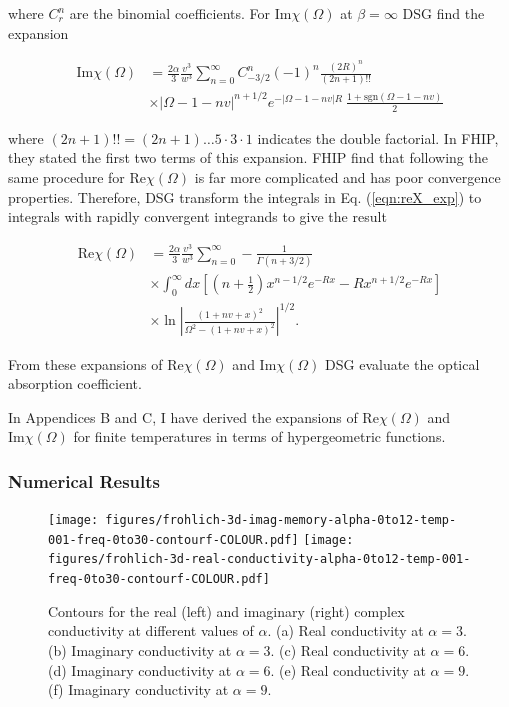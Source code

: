 where $C^n_r$ are the binomial coefficients. For $\text{Im}\chi(\Omega)$ at $\beta = \infty$ DSG find the expansion

\begin{equation}
    \begin{split}
        \textrm{Im}\chi(\Omega) &= \frac{2\alpha}{3} \frac{v^3}{w^3} \sum_{n=0}^\infty C^n_{-3/2} (-1)^n \frac{(2R)^n}{(2n + 1)!!} \\
        &\times |\Omega -1 - nv|^{n + 1/2} e^{-|\Omega - 1 -nv|R}\ \frac{1 + \textrm{sgn}(\Omega - 1 - nv)}{2}
    \end{split}
\end{equation}

where $(2n + 1)!! = (2n + 1) \dots 5 \cdot 3 \cdot 1$ indicates the double factorial. In FHIP, they stated the first two terms of this expansion. FHIP find that following the same procedure for $\text{Re}\chi(\Omega)$ is far more complicated and has poor convergence properties. Therefore, DSG transform the integrals in Eq. (\ref{eqn:reX_exp}) to integrals with rapidly convergent integrands to give the result

\begin{equation}
    \begin{split}
    \textrm{Re}\chi(\Omega) &= \frac{2\alpha}{3} \frac{v^3}{w^3} \sum_{n=0}^\infty -\frac{1}{\Gamma(n + 3/2)} \\
    &\times\int_0^\infty dx \left[ \left(n + \frac{1}{2}\right) x^{n-1/2} e^{-Rx} - R x^{n + 1/2} e^{-Rx} \right] \\
    &\times \ln{\left| \frac{(1 + nv + x)^2}{\Omega^2 - (1 + nv + x)^2} \right|^{1/2}}.
    \end{split}
\end{equation}

From these expansions of $\text{Re}\chi(\Omega)$ and $\text{Im}\chi(\Omega)$ DSG evaluate the optical absorption coefficient. 

In Appendices B and C, I have derived the expansions of $\text{Re}\chi(\Omega)$ and $\text{Im}\chi(\Omega)$ for finite temperatures in terms of hypergeometric functions.

\subsubsection{Numerical Results}

\begin{figure}[t]
    \centering
    \texttt{[image: figures/frohlich-3d-imag-memory-alpha-0to12-temp-001-freq-0to30-contourf-COLOUR.pdf]}
    \texttt{[image: figures/frohlich-3d-real-conductivity-alpha-0to12-temp-001-freq-0to30-contourf-COLOUR.pdf]}
    \caption{Contours for the real (left) and imaginary (right) complex conductivity at different values of $\alpha$. (a) Real conductivity at $\alpha = 3$. (b) Imaginary conductivity at $\alpha = 3$. (c) Real conductivity at $\alpha = 6$. (d) Imaginary conductivity at $\alpha = 6$. (e) Real conductivity at $\alpha = 9$. (f) Imaginary conductivity at $\alpha = 9$.}
    \label{fig:gscontour}
\end{figure}

